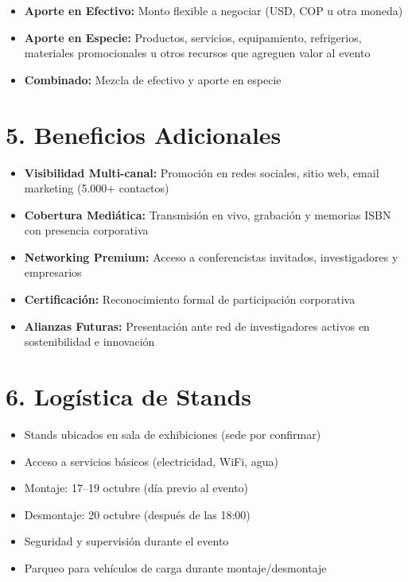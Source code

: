 \documentclass[11pt,a4paper]{article}
\begin{document}
\begin{itemize}\setlength{\itemsep}{0.08cm}
\item \textbf{Aporte en Efectivo:} Monto flexible a negociar (USD, COP u otra moneda)
\item \textbf{Aporte en Especie:} Productos, servicios, equipamiento, refrigerios, materiales promocionales u otros recursos que agreguen valor al evento
\item \textbf{Combinado:} Mezcla de efectivo y aporte en especie
\end{itemize}

\vspace{0.2cm}

\section*{5. Beneficios Adicionales}

\begin{itemize}\setlength{\itemsep}{0.08cm}
\item \textbf{Visibilidad Multi-canal:} Promoción en redes sociales, sitio web, email marketing (5.000+ contactos)
\item \textbf{Cobertura Mediática:} Transmisión en vivo, grabación y memorias ISBN con presencia corporativa
\item \textbf{Networking Premium:} Acceso a conferencistas invitados, investigadores y empresarios
\item \textbf{Certificación:} Reconocimiento formal de participación corporativa
\item \textbf{Alianzas Futuras:} Presentación ante red de investigadores activos en sostenibilidad e innovación
\end{itemize}

\vspace{0.2cm}

\section*{6. Logística de Stands}

\begin{itemize}\setlength{\itemsep}{0.08cm}
\item Stands ubicados en sala de exhibiciones (sede por confirmar)
\item Acceso a servicios básicos (electricidad, WiFi, agua)
\item Montaje: 17–19 octubre (día previo al evento)
\item Desmontaje: 20 octubre (después de las 18:00)
\item Seguridad y supervisión durante el evento
\item Parqueo para vehículos de carga durante montaje/desmontaje
\end{itemize}
\end{document}
